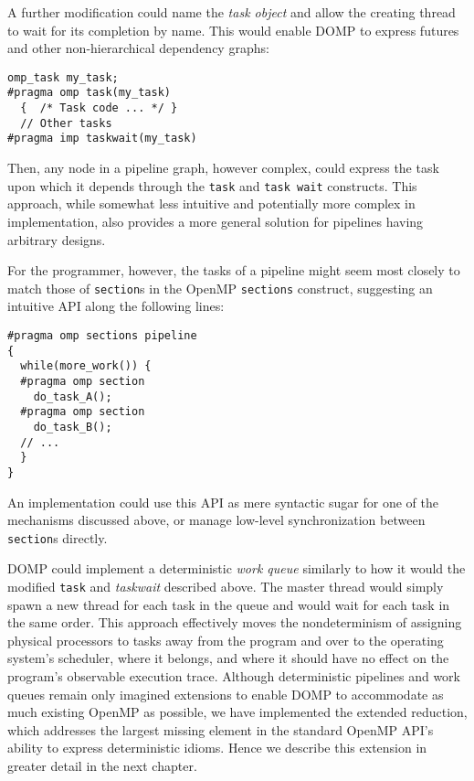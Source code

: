 A further modification could name the \textit{task object} and allow the creating thread to wait for its completion by name.  This would enable DOMP to express futures~\cite{halstead85multilisp} and other non-hierarchical dependency graphs:
\begin{small}
\begin{verbatim}
omp_task my_task;
#pragma omp task(my_task)
  {  /* Task code ... */ }
  // Other tasks
#pragma imp taskwait(my_task)
\end{verbatim}
\end{small}

Then, any node in a pipeline graph, however complex, could express the task upon which it depends through the \texttt{task} and \texttt{task wait} constructs.  This approach, while somewhat less intuitive and potentially more complex in implementation, also provides a more general solution for pipelines having arbitrary designs.

For the programmer, however, the tasks of a pipeline might seem most closely to match those of \texttt{section}s in the OpenMP \texttt{sections} construct, suggesting an intuitive API along the following lines:
\begin{small}
\begin{verbatim}
#pragma omp sections pipeline
{
  while(more_work()) {
  #pragma omp section
    do_task_A(); 
  #pragma omp section
    do_task_B();
  // ...
  }
}
\end{verbatim}
\end{small}
An implementation could use this API as mere syntactic sugar for one of the mechanisms discussed above, or manage low-level synchronization between \texttt{section}s directly.

DOMP could implement a deterministic \textit{work queue} similarly to how it would the modified \texttt{task} and \textit{taskwait} described above.  The master thread would simply spawn a new thread for each task in the queue and would wait for each task in the same order.  This approach effectively moves the nondeterminism of assigning physical processors to tasks away from the program and over to the operating system's scheduler, where it belongs, and where it should have no effect on the program's observable execution trace.
\parasep
Although deterministic pipelines and work queues remain only imagined extensions to enable DOMP to accommodate as much existing OpenMP as possible, we have implemented the extended reduction, which addresses the largest missing element in the standard OpenMP API's ability to express deterministic idioms.  Hence we describe this extension in greater detail in the next chapter.